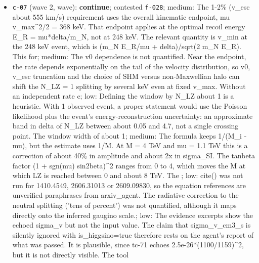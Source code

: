 \documentclass[11pt,a4paper]{article}
\begin{document}
\begin{itemize}
  \item \texttt{c-07} (wave 2, wave): \textbf{continue}; contested \texttt{f-028}; medium: The 1-2\% (v\_esc about 555 km/s) requirement uses the overall kinematic endpoint, mu v\_max\textasciicircum{}2/2 = 368 keV. That endpoint applies at the optimal recoil energy E\_R = mu*delta/m\_N, not at 248 keV. The relevant quantity is v\_min at the 248 keV event, which is (m\_N E\_R/mu + delta)/sqrt(2 m\_N E\_R). This for; medium: The v0 dependence is not quantified. Near the endpoint, the rate depends exponentially on the tail of the velocity distribution, so v0, v\_esc truncation and the choice of SHM versus non-Maxwellian halo can shift the N\_LZ = 1 splitting by several keV even at fixed v\_max. Without an independent rate c; low: Defining the window by N\_LZ about 1 is a heuristic. With 1 observed event, a proper statement would use the Poisson likelihood plus the event's energy-reconstruction uncertainty: an approximate band in delta of N\_LZ between about 0.05 and 4.7, not a single crossing point. The window width of about 1; medium: The formula keeps 1/(M\_i - \textbar{}mu\textbar{}), but the estimate uses 1/M. At M = 4 TeV and mu = 1.1 TeV this is a correction of about 40\% in amplitude and about 2x in sigma\_SI. The tanbeta factor (1 + sgn(mu) sin2beta)\textasciicircum{}2 ranges from 0 to 4, which moves the M at which LZ is reached between 0 and about 8 TeV. The ; low: cite() was not run for 1410.4549, 2606.31013 or 2609.09830, so the equation references are unverified paraphrases from arxiv\_agent. The radiative correction to the neutral splitting ('tens of percent') was not quantified, although it maps directly onto the inferred gaugino scale.; low: The evidence excerpts show the echoed sigma\_v but not the input value. The claim that sigma\_v\_cm3\_s is silently ignored with is\_higgsino=true therefore rests on the agent's report of what was passed. It is plausible, since tc-71 echoes 2.5e-26*(1100/1159)\textasciicircum{}2, but it is not directly visible. The tool 

\end{itemize}
\end{document}
